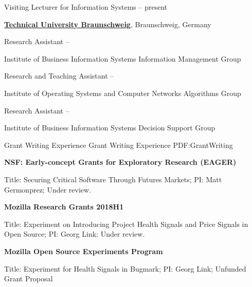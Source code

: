 \documentclass[letterpaper,MMMyyyy,nonstopmode]{simpleresumecv}
\begin{document}
\begin{Body}
\Gap
\BulletItem
Visiting Lecturer for Information Systems
\hfill
{} --
present

\BigGap
\Entry
\href{http://www.tu-bs.de}
{\textbf{Technical University Braunschweig}},
Braunschweig, Germany

\Gap
\BulletItem
Research Assistant
\hfill
{} --
\begin{Detail}
\SubBulletItem
Institute of Business Information Systems\newline
Information Management Group
\end{Detail}

\Gap
\BulletItem
Research and Teaching Assistant
\hfill
{} --
\begin{Detail}
\SubBulletItem
Institute of Operating Systems and Computer Networks\newline
Algorithms Group
\end{Detail}

\Gap
\BulletItem
Research Assistant
\hfill
{} --
\begin{Detail}
\SubBulletItem
Institute of Business Information Systems\newline
Decision Support Group
\end{Detail}



\newpage

\Section
{Grant Writing Experience}
{Grant Writing Experience}
{PDF:GrantWriting}

\Entry
\textbf{NSF: Early-concept Grants for Exploratory Research (EAGER) }
\hfill
{}
\begin{Detail}
Title: Securing Critical Software Through Futures Markets;
PI: Matt Germonprez;
Under review.
\end{Detail}


\BigGap
\Entry
\textbf{Mozilla Research Grants 2018H1}
\hfill
{}
\begin{Detail}
Title: Experiment on Introducing Project Health Signals and Price Signals in Open Source;
PI: Georg Link;
Under review.
\end{Detail}


\BigGap
\Entry
\textbf{Mozilla Open Source Experiments Program}
\hfill
{}
\begin{Detail}
Title: Experiment for Health Signals in Bugmark;
PI: Georg Link;
Unfunded Grant Proposal
\end{Detail}



\end{Body}
\end{document}
